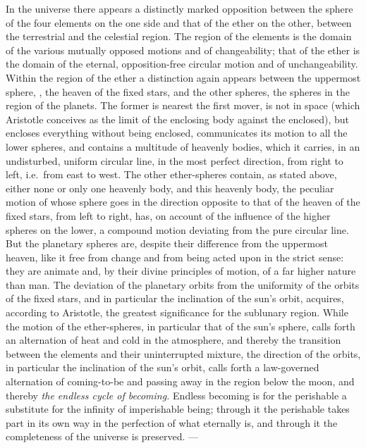 In the universe there appears a distinctly marked opposition between
the sphere of the four elements on the one side and that of the ether
on the other, between the terrestrial and the celestial region. The
region of the elements is the domain of the various mutually opposed
motions and of changeability; that of the ether is the domain of the
eternal, opposition-free circular motion and of unchangeability. Within
the region of the ether a distinction again appears between the
uppermost sphere, , the heaven of the fixed stars, and the other
spheres, the spheres in the region of the planets. The former is
nearest the first mover, is not in space (which Aristotle conceives as
the limit of the enclosing body against the enclosed), but encloses
everything without being enclosed, communicates its motion to all the
lower spheres, and contains a multitude of heavenly bodies, which it
carries, in an undisturbed, uniform circular line, in the
most perfect direction, from right to left, i.e.\ from east to west.
The other ether-spheres contain, as stated above, either none or only
one heavenly body, and this heavenly body, the peculiar motion of whose
sphere goes in the direction opposite to that of the heaven of the
fixed stars, from left to right, has, on account of the influence of
the higher spheres on the lower, a compound motion deviating from the
pure circular line. But the planetary spheres are, despite their
difference from the uppermost heaven, like it free from change and from
being acted upon in the strict sense: they are animate and, by their
divine principles of motion, of a far higher nature than man. The
deviation of the planetary orbits from the uniformity of the orbits of
the fixed stars, and in particular the inclination of the sun's orbit,
acquires, according to Aristotle, the greatest significance for the
sublunary region. While the motion of the ether-spheres, in particular
that of the sun's sphere, calls forth an alternation of heat and cold
in the atmosphere, and thereby the transition between the elements and
their uninterrupted mixture, the direction of the orbits, in particular
the inclination of the sun's orbit, calls forth a law-governed
alternation of coming-to-be and passing away in the region below the
moon, and thereby \emph{the endless cycle of becoming.} Endless
becoming is for the perishable a substitute for the infinity of
imperishable being; through it the perishable takes part in its own
way in the perfection of what eternally is, and through it the
completeness of the universe is preserved. ---

